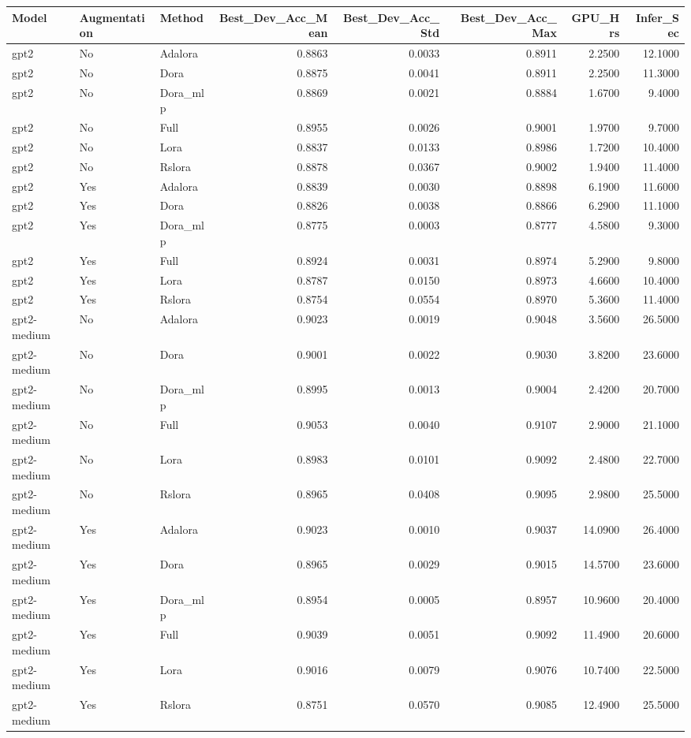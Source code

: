 \begin{tabular}{lllrrrrr}
\toprule
Model & Augmentation & Method & Best_Dev_Acc_Mean & Best_Dev_Acc_Std & Best_Dev_Acc_Max & GPU_Hrs & Infer_Sec \\
\midrule
gpt2 & No & Adalora & 0.8863 & 0.0033 & 0.8911 & 2.2500 & 12.1000 \\
gpt2 & No & Dora & 0.8875 & 0.0041 & 0.8911 & 2.2500 & 11.3000 \\
gpt2 & No & Dora_mlp & 0.8869 & 0.0021 & 0.8884 & 1.6700 & 9.4000 \\
gpt2 & No & Full & 0.8955 & 0.0026 & 0.9001 & 1.9700 & 9.7000 \\
gpt2 & No & Lora & 0.8837 & 0.0133 & 0.8986 & 1.7200 & 10.4000 \\
gpt2 & No & Rslora & 0.8878 & 0.0367 & 0.9002 & 1.9400 & 11.4000 \\
gpt2 & Yes & Adalora & 0.8839 & 0.0030 & 0.8898 & 6.1900 & 11.6000 \\
gpt2 & Yes & Dora & 0.8826 & 0.0038 & 0.8866 & 6.2900 & 11.1000 \\
gpt2 & Yes & Dora_mlp & 0.8775 & 0.0003 & 0.8777 & 4.5800 & 9.3000 \\
gpt2 & Yes & Full & 0.8924 & 0.0031 & 0.8974 & 5.2900 & 9.8000 \\
gpt2 & Yes & Lora & 0.8787 & 0.0150 & 0.8973 & 4.6600 & 10.4000 \\
gpt2 & Yes & Rslora & 0.8754 & 0.0554 & 0.8970 & 5.3600 & 11.4000 \\
gpt2-medium & No & Adalora & 0.9023 & 0.0019 & 0.9048 & 3.5600 & 26.5000 \\
gpt2-medium & No & Dora & 0.9001 & 0.0022 & 0.9030 & 3.8200 & 23.6000 \\
gpt2-medium & No & Dora_mlp & 0.8995 & 0.0013 & 0.9004 & 2.4200 & 20.7000 \\
gpt2-medium & No & Full & 0.9053 & 0.0040 & 0.9107 & 2.9000 & 21.1000 \\
gpt2-medium & No & Lora & 0.8983 & 0.0101 & 0.9092 & 2.4800 & 22.7000 \\
gpt2-medium & No & Rslora & 0.8965 & 0.0408 & 0.9095 & 2.9800 & 25.5000 \\
gpt2-medium & Yes & Adalora & 0.9023 & 0.0010 & 0.9037 & 14.0900 & 26.4000 \\
gpt2-medium & Yes & Dora & 0.8965 & 0.0029 & 0.9015 & 14.5700 & 23.6000 \\
gpt2-medium & Yes & Dora_mlp & 0.8954 & 0.0005 & 0.8957 & 10.9600 & 20.4000 \\
gpt2-medium & Yes & Full & 0.9039 & 0.0051 & 0.9092 & 11.4900 & 20.6000 \\
gpt2-medium & Yes & Lora & 0.9016 & 0.0079 & 0.9076 & 10.7400 & 22.5000 \\
gpt2-medium & Yes & Rslora & 0.8751 & 0.0570 & 0.9085 & 12.4900 & 25.5000 \\
\bottomrule
\end{tabular}
